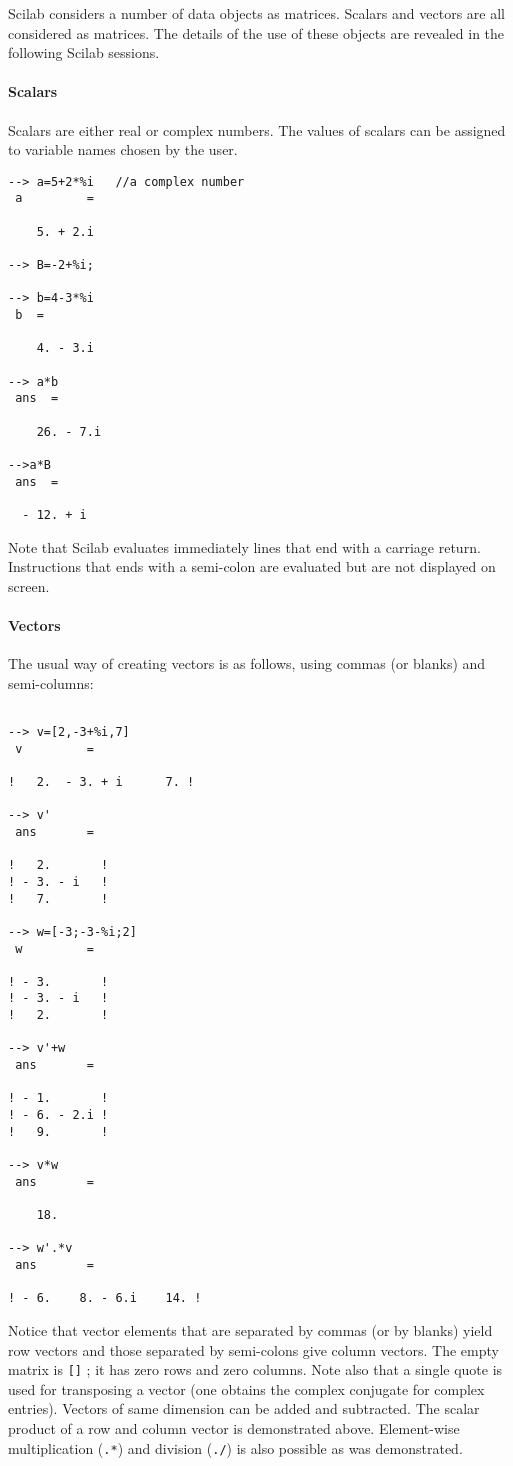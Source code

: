 	Scilab considers a number of data objects as matrices.  
Scalars and  vectors are all considered as matrices.  The details of the use
of these objects are revealed in the following Scilab sessions.

\paragraph{Scalars}
Scalars are either real or complex numbers.  The values of
scalars can be assigned to variable names chosen by the user.
\begin{verbatim}
--> a=5+2*%i   //a complex number
 a         =
 
    5. + 2.i  
 
--> B=-2+%i;

--> b=4-3*%i
 b  =
 
    4. - 3.i 
 
--> a*b
 ans  =
 
    26. - 7.i  
 
-->a*B
 ans  =
 
  - 12. + i    
\end{verbatim}
Note that Scilab evaluates immediately lines that
end with a carriage return.  Instructions that ends with a semi-colon
are evaluated but are not displayed on screen. 

\paragraph{Vectors}
The usual way of creating vectors is as follows, using 
commas (or blanks) and semi-columns:
\begin{verbatim}
 
--> v=[2,-3+%i,7]
 v         =
 
!   2.  - 3. + i      7. !
 
--> v'
 ans       =
 
!   2.       !
! - 3. - i   !
!   7.       !
 
--> w=[-3;-3-%i;2]
 w         =
 
! - 3.       !
! - 3. - i   !
!   2.       !
 
--> v'+w
 ans       =
 
! - 1.       !
! - 6. - 2.i !
!   9.       !
 
--> v*w
 ans       =
 
    18.  
 
--> w'.*v
 ans       =
 
! - 6.    8. - 6.i    14. !
\end{verbatim}
Notice that vector elements that are separated by commas (or by blanks)
yield row vectors and those separated by semi-colons give column
vectors. The empty matrix is \verb![]! ; it has zero rows and zero columns.
Note also that a single quote is used for transposing a 
vector 
(one obtains the complex conjugate for complex entries).  Vectors of same
dimension can be added and subtracted.  The scalar product of a row and
column vector is demonstrated above.  Element-wise
multiplication ({\tt .*}) and division ({\tt ./}) is also possible 
as was demonstrated.


